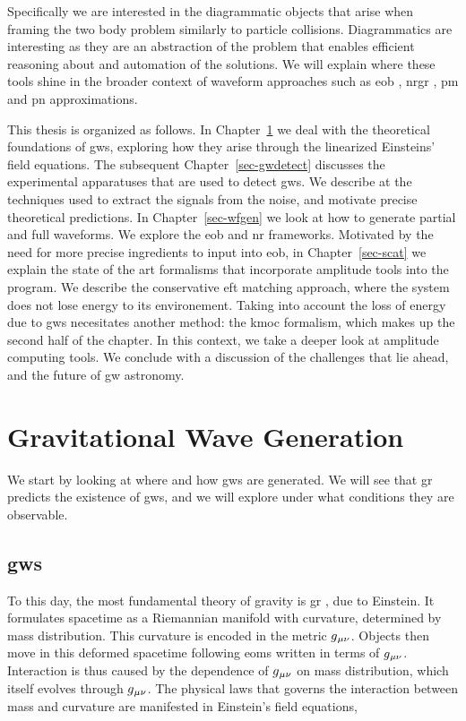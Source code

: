 \documentclass[
  10pt,
  a4paper,
  DIV=11,
  numbers=noendperiod,
  twoside]{scrreprt}
\DeclareRobustCommand{\[}{\begin{equation}}
\DeclareRobustCommand{\]}{\end{equation}}
\begin{document}
Specifically we are interested in the diagrammatic objects that arise
when framing the two body problem similarly to particle collisions.
Diagrammatics are interesting as they are an abstraction of the problem
that enables efficient reasoning about and automation of the solutions.
We will explain where these tools shine in the broader context of
waveform approaches such as \gls{eob} , \gls{nrgr} , \gls{pm} and
\gls{pn} approximations.

This thesis is organized as follows. In Chapter~\ref{sec-gwgen} we deal
with the theoretical foundations of \glspl{gw}, exploring how they arise
through the linearized Einsteins' field equations. The subsequent
Chapter~\ref{sec-gwdetect} discusses the experimental apparatuses that
are used to detect \glspl{gw}. We describe at the techniques used to
extract the signals from the noise, and motivate precise theoretical
predictions. In Chapter~\ref{sec-wfgen} we look at how to generate
partial and full waveforms. We explore the \gls{eob} and \gls{nr}
frameworks. Motivated by the need for more precise ingredients to input
into \gls{eob}, in Chapter~\ref{sec-scat} we explain the state of the
art formalisms that incorporate amplitude tools into the program. We
describe the conservative \gls{eft} matching approach, where the system
does not lose energy to its environement. Taking into account the loss
of energy due to \glspl{gw} necesitates another method: the \gls{kmoc}
formalism, which makes up the second half of the chapter. In this
context, we take a deeper look at amplitude computing tools. We conclude
with a discussion of the challenges that lie ahead, and the future of
\gls{gw} astronomy.


\hypertarget{sec-gwgen}{%
\chapter{Gravitational Wave Generation}\label{sec-gwgen}}

We start by looking at where and how \glspl{gw} are generated. We will
see that \gls{gr} predicts the existence of \glspl{gw}, and we will
explore under what conditions they are observable.

\hypertarget{sgw}{%
\section{\texorpdfstring{\glspl{gw}}{}}\label{sgw}}

To this day, the most fundamental theory of gravity is \gls{gr} , due to
Einstein. It formulates spacetime as a Riemannian manifold with
curvature, determined by mass distribution. This curvature is encoded in
the metric \(g{}_{\mu\nu}\). Objects then move in this deformed spacetime
following \glspl{eom} written in terms of \(g{}_{\mu\nu}\). Interaction is thus
caused by the dependence of \(g{}_{\mu\nu}\) on mass distribution, which itself
evolves through \(g{}_{\mu\nu}\). The physical laws that governs the interaction
between mass and curvature are manifested in Einstein's field equations,
\end{document}
